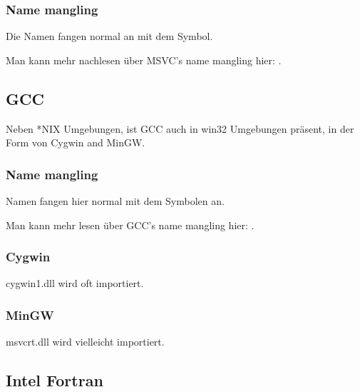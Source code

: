 
\subsubsection{Name mangling}

Die Namen fangen normal an mit dem  Symbol.

Man kann mehr nachlesen über MSVC's \gls{name mangling} hier: . %

\subsection{GCC}

Neben *NIX Umgebungen, ist GCC auch in win32 Umgebungen präsent, in der Form von Cygwin and MinGW. 

\subsubsection{Name mangling}

Namen fangen hier normal mit dem  Symbolen an.

Man kann mehr lesen über GCC's \gls{name mangling} hier: .

\subsubsection{Cygwin}

cygwin1.dll wird oft importiert.

\subsubsection{MinGW}

msvcrt.dll wird vielleicht importiert.

\subsection{Intel Fortran}


